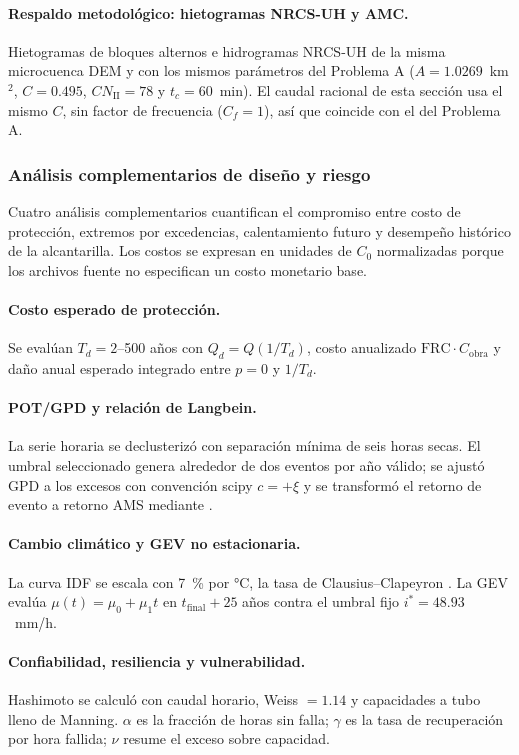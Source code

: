 \paragraph{Respaldo metodológico: hietogramas NRCS-UH y AMC.} Hietogramas de bloques alternos e hidrogramas NRCS-UH \citep{nrcs2007cap16}
de la misma microcuenca DEM y con los mismos parámetros del Problema A ($A=1.0269$~km$^2$, $C=0.495$,
$CN_\mathrm{II}=78$ y $t_c=60$~min). El caudal racional de esta sección usa el mismo $C$, sin factor de frecuencia
($C_f = 1$), así que coincide con el del Problema A.

\subsubsection{Análisis complementarios de diseño y riesgo}
Cuatro análisis complementarios cuantifican el compromiso entre costo de protección, extremos por excedencias,
calentamiento futuro y desempeño histórico de la alcantarilla. Los costos se expresan en unidades de $C_0$
normalizadas porque los archivos fuente no especifican un costo monetario base.

\paragraph{Costo esperado de protección.} Se evalúan $T_d=2$--500 años con $Q_d=Q(1/T_d)$, costo anualizado
$\mathrm{FRC}\cdot C_\mathrm{obra}$ y daño anual esperado integrado entre $p=0$ y $1/T_d$.

\paragraph{POT/GPD y relación de Langbein.} La serie horaria se declusterizó con separación mínima de seis horas
secas. El umbral seleccionado genera alrededor de dos eventos por año válido; se ajustó GPD \citep{coles2001} a los excesos con
convención scipy $c=+\xi$ y se transformó el retorno de evento a retorno AMS mediante \citet{langbein1949}.

\paragraph{Cambio climático y GEV no estacionaria.} La curva IDF se escala con 7~\% por °C, la tasa de Clausius--Clapeyron \citep{fowler2021}. La GEV evalúa
$\mu(t)=\mu_0+\mu_1 t$ en $t_\mathrm{final}+25$ años contra el umbral fijo $i^*=48.93$~mm/h.

\paragraph{Confiabilidad, resiliencia y vulnerabilidad.} Hashimoto \citep{hashimoto1982} se calculó con caudal horario, Weiss $=1.14$ y
capacidades a tubo lleno de Manning. $\alpha$ es la fracción de horas sin falla; $\gamma$ es la tasa de recuperación
por hora fallida; $\nu$ resume el exceso sobre capacidad.
